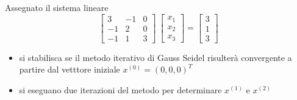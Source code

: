  Assegnato il sistema lineare
\[ \left[ \begin{array}{ccc} 3 & -1 & 0 \\ -1 & 2 & 0\\-1 & 1&3
\end{array} \right] \ \left[ \begin{array}{c}  x_1 \\ x_2 \\
x_3
\end{array} \right] =
\left[ \begin{array}{c}  3 \\ 1\\ 3
\end{array} \right]
\]
\begin{itemize}
\item si stabilisca  se il metodo iterativo di
Gauss Seidel risulter\`a convergente a partire dal vetttore iniziale
$x^{(0)}=(0,0,0)^T$
\item si eseguano due iterazioni del metodo per determinare $x^{(1)}$ e
$x^{(2)}$ 
\end{itemize} 